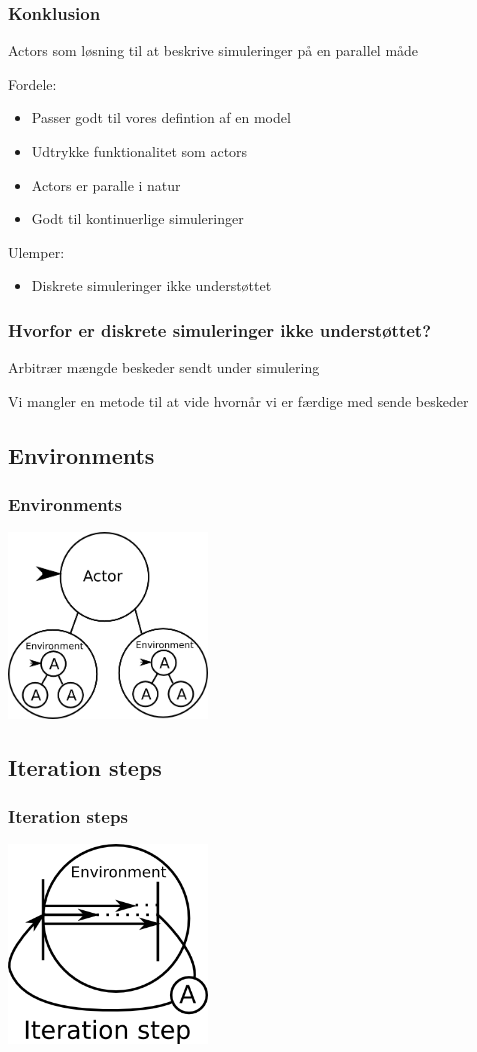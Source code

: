 \begin{frame}
	\frametitle{Konklusion}
	Actors som løsning til at beskrive simuleringer på en parallel måde
	
	
  Fordele:
    \begin{itemize}
      \item Passer godt til vores defintion af en model
      \item Udtrykke funktionalitet som actors
      \item Actors er paralle i natur
      \item Godt til kontinuerlige simuleringer
    \end{itemize}
  Ulemper:
    \begin{itemize}
      \item Diskrete simuleringer ikke understøttet
    \end{itemize}
\end{frame}

\begin{frame}
  \frametitle{Hvorfor er diskrete simuleringer ikke understøttet?}
    Arbitrær mængde beskeder sendt under simulering\newline
    
    
    Vi mangler en metode til at vide hvornår vi er færdige med sende beskeder
\end{frame}

\subsection{Environments}
\begin{frame}
	\frametitle{Environments}
	\includegraphics[width=200px]{Images/environment.png}
\end{frame}
\subsection{Iteration steps}
\begin{frame}
  \frametitle{Iteration steps}
  \includegraphics[width=200px]{Images/iteration.png}
\end{frame}


